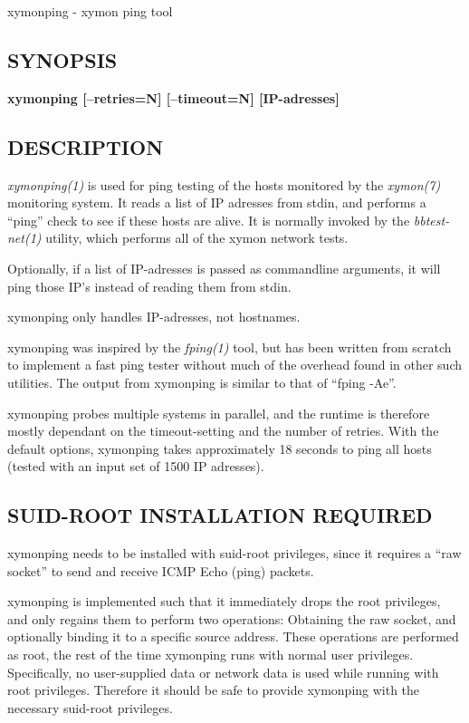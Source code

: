  xymonping - xymon ping tool
 \subsection{SYNOPSIS}
\textbf{xymonping [--retries=N] [--timeout=N] [IP-adresses]}


 
\subsection{DESCRIPTION}
\emph{xymonping(1)}
 is used for ping testing of the hosts monitored by the
 \emph{xymon(7)} monitoring system. It reads a list of IP adresses
 from stdin, and performs a ``ping'' check to see if these hosts are
 alive. It is normally invoked by the \emph{bbtest-net(1)} utility,
 which performs all of the xymon network tests. 


  Optionally, if a list of IP-adresses is passed as commandline
  arguments, it will ping those IP's instead of reading them from
  stdin. 



  xymonping only handles IP-adresses, not hostnames. 


  xymonping was inspired by the \emph{fping(1)} tool, but has been
  written from scratch to implement a fast ping tester without much of
  the overhead found in other such utilities. The output from
  xymonping is similar to that of ``fping -Ae''. 



  xymonping probes multiple systems in parallel, and the runtime is
  therefore mostly dependant on the timeout-setting and the number of
  retries. With the default options, xymonping takes approximately 18
  seconds to ping all hosts (tested with an input set of 1500 IP
  adresses). 



 
\subsection{SUID-ROOT INSTALLATION REQUIRED}
 xymonping needs to be installed with suid-root privileges, since it
 requires a ``raw socket'' to send and receive ICMP Echo (ping)
 packets. 


  xymonping is implemented such that it immediately drops the root
  privileges, and only regains them to perform two operations:
  Obtaining the raw socket, and optionally binding it to a specific
  source address. These operations are performed as root, the rest of
  the time xymonping runs with normal user privileges. Specifically,
  no user-supplied data or network data is used while running with
  root privileges. Therefore it should be safe to provide xymonping
  with the necessary suid-root privileges. 



